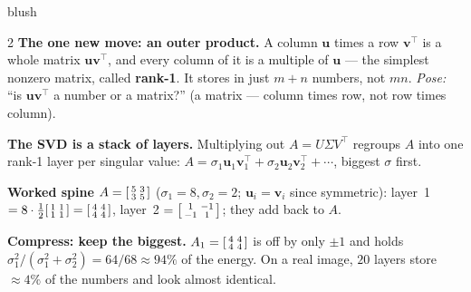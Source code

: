 \documentclass[10pt]{article}
\newcommand{\uu}{\mathbf{u}}
\newcommand{\vv}{\mathbf{v}}
\newcommand{\T}{^{\top}}
\begin{document}
\begin{skillbox}[Lesson]{blush}
\begin{multicols}{2}
\textbf{The one new move: an outer product.} A column $\uu$ times a row $\vv\T$ is a whole matrix
$\uu\vv\T$, and every column of it is a multiple of $\uu$ --- the simplest nonzero matrix, called
\textbf{rank-1}. It stores in just $m+n$ numbers, not $mn$. \emph{Pose:} ``is $\uu\vv\T$ a number or a
matrix?'' (a matrix --- column times row, not row times column).

\textbf{The SVD is a stack of layers.} Multiplying out $A=U\Sigma V\T$ regroups $A$ into one rank-1 layer
per singular value: $A=\sigma_1\uu_1\vv_1\T+\sigma_2\uu_2\vv_2\T+\cdots$, biggest $\sigma$ first.

\columnbreak

\textbf{Worked spine $A=\begin{bsmallmatrix} 5 & 3\\ 3 & 5 \end{bsmallmatrix}$} ($\sigma_1=8,\sigma_2=2$;
$\uu_i=\vv_i$ since symmetric): layer~1 $=8\cdot\tfrac12\begin{bsmallmatrix} 1 & 1\\ 1 & 1 \end{bsmallmatrix}=\begin{bsmallmatrix} 4 & 4\\ 4 & 4 \end{bsmallmatrix}$,
layer~2 $=\begin{bsmallmatrix} 1 & -1\\ -1 & 1 \end{bsmallmatrix}$; they add back to $A$.

\textbf{Compress: keep the biggest.} $A_1=\begin{bsmallmatrix} 4 & 4\\ 4 & 4 \end{bsmallmatrix}$ is off by
only $\pm1$ and holds $\sigma_1^2/(\sigma_1^2+\sigma_2^2)=64/68\approx94\%$ of the energy. On a real image,
$20$ layers store $\approx4\%$ of the numbers and look almost identical.
\end{multicols}
\end{skillbox}
\end{document}
